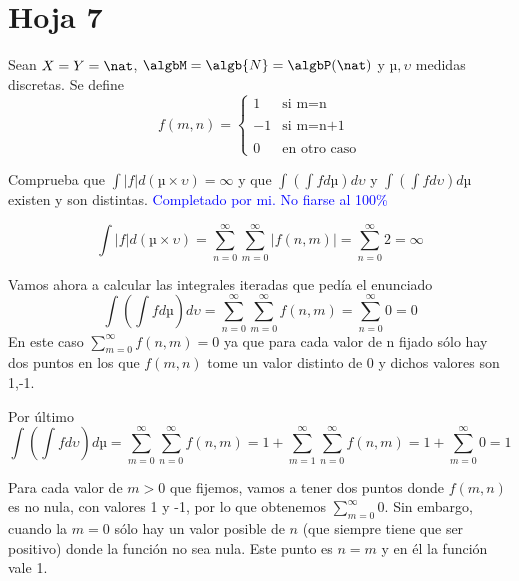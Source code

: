 \section{Hoja 7}
\begin{problem}[1]
Sean $X=Y=\nat$, $\algbM=\algb{N}=\algbP(\nat)$ y $µ,\upsilon$ medidas discretas. Se define
\[f(m,n)= \left\{ \begin{array}{lcc}
             1 &   \text{si m=n} \\
             \\ -1 &  \text{si m=n+1} \\
             \\ 0 &  \text{en otro caso}
             \end{array}
   \right.\]

Comprueba que $\int |f|d(µ\times \upsilon)=\infty$ y que $\int(\int f dµ)d\upsilon$ y $\int(\int f d\upsilon)dµ$ existen y son distintas.
\solution
\textcolor{blue}{Completado por mi. No fiarse al 100\%}

\[\int |f|d(µ\times \upsilon)=\sum_{n=0}^{\infty} \sum_{m=0}^{\infty}|f(n,m)| = \sum_{n=0}^{\infty} 2 = \infty\]

Vamos ahora a calcular las integrales iteradas que pedía el enunciado
\[\int\left(\int f dµ\right)d\upsilon = \sum_{n=0}^{\infty} \sum_{m=0}^{\infty}f(n,m) = \sum_{n=0}^{\infty} 0 = 0 \]
En este caso $\sum_{m=0}^{\infty}f(n,m) = 0$ ya que para cada valor de n fijado sólo hay dos puntos en los que $f(m,n)$ tome un valor distinto de 0 y dichos valores son 1,-1.

Por último
\[\int\left(\int f d\upsilon\right)dµ = \sum_{m=0}^{\infty} \sum_{n=0}^{\infty}f(n,m) = 1 + \sum_{m=1}^{\infty} \sum_{n=0}^{\infty}f(n,m) = 1+ \sum_{m=0}^{\infty} 0 = 1 \]

Para cada valor de $m > 0$ que fijemos, vamos a tener dos puntos donde $f(m,n)$ es no nula, con valores 1 y -1, por lo que obtenemos $\sum_{m=0}^{\infty} 0 $. Sin embargo, cuando la $m=0$ sólo hay un valor posible de $n$ (que siempre tiene que ser positivo) donde la función no sea nula. Este punto es $n=m$ y en él la función vale 1.
\end{problem}

